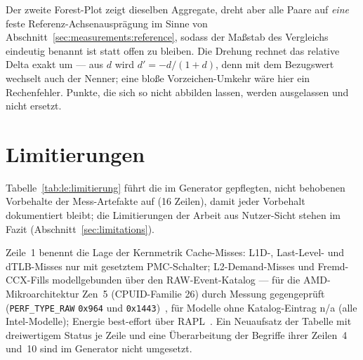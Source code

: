 
Der zweite Forest-Plot zeigt dieselben Aggregate, dreht aber alle Paare auf \emph{eine} feste
Referenz-Achsen\-ausprägung im Sinne von Abschnitt~\ref{sec:measurements:reference}, sodass der
Maßstab des Vergleichs eindeutig benannt ist statt offen zu bleiben. Die Drehung rechnet das
relative Delta exakt um --- aus $d$ wird $d' = -d/(1+d)$, denn mit dem Bezugswert wechselt auch der
Nenner; eine bloße Vorzeichen-Umkehr wäre hier ein Rechenfehler. Punkte, die sich so nicht
abbilden lassen, werden ausgelassen und nicht ersetzt.


\section{Limitierungen}\label{sec:measurements:limitations}

Tabelle~\ref{tab:le:limitierung} führt die im Generator gepflegten, nicht behobenen Vorbehalte der
Mess-Artefakte auf (16 Zeilen), damit jeder Vorbehalt dokumentiert bleibt; die Limitierungen der Arbeit aus
Nutzer-Sicht stehen im Fazit (Abschnitt~\ref{sec:limitations}).



Zeile~1 benennt die Lage der
Kernmetrik Cache-Misses: L1D-, Last-Level- und dTLB-Misses nur mit gesetztem PMC-Schalter;
L2-Demand-Misses und Fremd-CCX-Fills modellgebunden über den RAW-Event-Katalog --- für die
AMD-Mikroarchitektur Zen~5 (CPUID-Familie 26) durch Messung gegengeprüft (\texttt{PERF\_TYPE\_RAW}
\texttt{0x964} und \texttt{0x1443})~\cite{linux_perf_amdzen5}, für Modelle ohne Katalog-Eintrag %
n/a (alle Intel-Modelle); Energie best-effort über RAPL~\cite{david2010rapl}. Ein Neuaufsatz
der Tabelle mit dreiwertigem Status je Zeile und eine Überarbeitung der Begriffe ihrer Zeilen~4 und~10
sind im Generator nicht umgesetzt.
